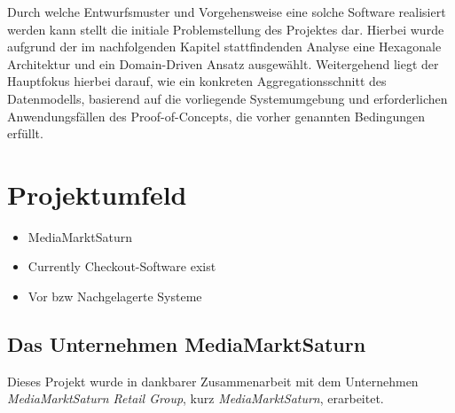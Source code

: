 Durch welche Entwurfsmuster und Vorgehensweise eine solche Software realisiert werden kann stellt die initiale Problemstellung des Projektes dar. Hierbei wurde aufgrund der im nachfolgenden Kapitel stattfindenden Analyse eine Hexagonale Architektur und ein Domain-Driven Ansatz ausgewählt. Weitergehend liegt der Hauptfokus hierbei darauf, wie ein konkreten Aggregationsschnitt des Datenmodells, basierend auf die vorliegende Systemumgebung und erforderlichen Anwendungsfällen des Proof-of-Concepts, die vorher genannten Bedingungen erfüllt.






\section{Projektumfeld}
\begin{itemize}[noitemsep,nolistsep]
	\item MediaMarktSaturn
	\item Currently Checkout-Software exist
	\item Vor bzw Nachgelagerte Systeme
\end{itemize}

\subsection{Das Unternehmen MediaMarktSaturn}


Dieses Projekt wurde in dankbarer Zusammenarbeit mit dem Unternehmen \emph{MediaMarktSaturn Retail Group}, kurz \emph{MediaMarktSaturn}, erarbeitet. %

